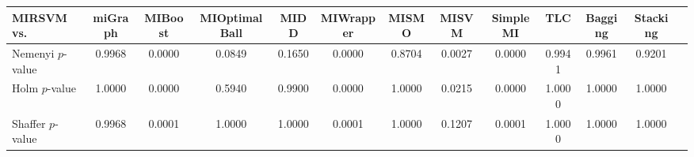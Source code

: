 \begin{threeparttable}
\begin{tabular}{lcccccccccccc}
\toprule
MIRSVM vs. &miGraph &MIBoost &MIOptimalBall &MIDD &MIWrapper &MISMO &MISVM &SimpleMI &TLC &Bagging &Stacking \\
\midrule
Nemenyi $p$-value &0.9968 &0.0000 &0.0849 &0.1650 &0.0000 &0.8704 &0.0027 &0.0000 &0.9941 &0.9961 &0.9201 &  \\
Holm $p$-value &1.0000 &0.0000 &0.5940 &0.9900 &0.0000 &1.0000 &0.0215 &0.0000 &1.0000 &1.0000 &1.0000 &  \\
Shaffer $p$-value &0.9968 &0.0001 &1.0000 &1.0000 &0.0001 &1.0000 &0.1207 &0.0001 &1.0000 &1.0000 &1.0000 &  \\
\bottomrule
\end{tabular}
\end{threeparttable}